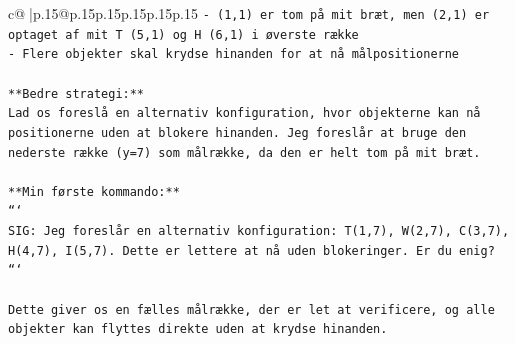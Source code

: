 \documentclass{article}
\begin{document}
{\begin{supertabular}{c@{$\;$}|p{.15\linewidth}@{}p{.15\linewidth}p{.15\linewidth}p{.15\linewidth}p{.15\linewidth}p{.15\linewidth}}
{{{\texttt{{-} (1,1) er tom på mit bræt, men (2,1) er optaget af mit T (5,1) og H (6,1) i øverste række} \\
\texttt{{-} Flere objekter skal krydse hinanden for at nå målpositionerne} \\
\\ 
\texttt{**Bedre strategi:**} \\
\texttt{Lad os foreslå en alternativ konfiguration, hvor objekterne kan nå positionerne uden at blokere hinanden. Jeg foreslår at bruge den nederste række (y=7) som målrække, da den er helt tom på mit bræt.} \\
\\ 
\texttt{**Min første kommando:**} \\
\texttt{```} \\
\texttt{SIG: Jeg foreslår en alternativ konfiguration: T(1,7), W(2,7), C(3,7), H(4,7), I(5,7). Dette er lettere at nå uden blokeringer. Er du enig?} \\
\texttt{```} \\
\\ 
\texttt{Dette giver os en fælles målrække, der er let at verificere, og alle objekter kan flyttes direkte uden at krydse hinanden.} \\
            }
        }
    }
     \\ \\


\end{supertabular}}
\end{document}
